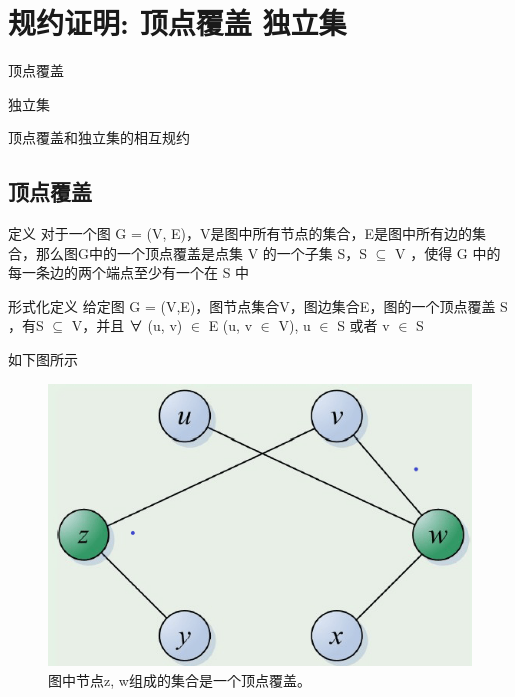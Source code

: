\chapter{规约证明: 顶点覆盖  独立集}

\begin{introduction}
	\item 顶点覆盖
	\item 独立集
	\item 顶点覆盖和独立集的相互规约
\end{introduction}


\section{顶点覆盖}


\begin{definition}{定义}
	对于一个图 G = (V, E)，V是图中所有节点的集合，E是图中所有边的集合，那么图G中的一个顶点覆盖是点集 V 的一个子集 S，S $ \subseteq $ V ，使得 G 中的每一条边的两个端点至少有一个在 S 中
\end{definition}

\begin{definition}{形式化定义}
    给定图 G = (V,E)，图节点集合V，图边集合E，图的一个顶点覆盖 S ，有S $ \subseteq $ V，并且 ∀ (u, v) $ \in $ E (u, v $ \in $ V), u $ \in $ S 或者 v $ \in $ S
\end{definition}

\begin{example}
    如下图所示
	\begin{figure}[hbt]
        \centering
        \includegraphics{image/Proof-of-Statute1.png}
        \caption{图中节点z, w组成的集合是一个顶点覆盖。}\label{fig:example}
    \end{figure}
\end{example}

